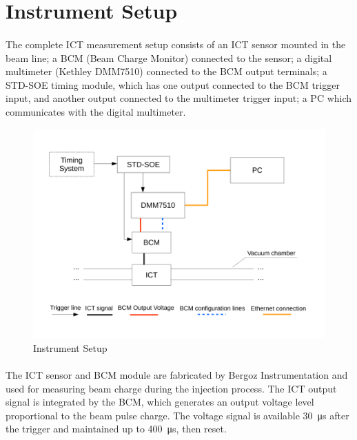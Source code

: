 \documentclass[openany]{article}
\begin{document}
\section{Instrument Setup}

	\paragraph{} The complete ICT measurement setup consists of an ICT sensor mounted in the beam line; a BCM (Beam Charge Monitor) connected to the sensor; a digital multimeter (Kethley DMM7510) connected to the BCM output terminals; a STD-SOE timing module, which has one output connected to the BCM trigger input, and another output connected to the multimeter trigger input; a PC which communicates with the digital multimeter.

	\begin{figure}[!h]
	\caption{Instrument Setup}
	\label{fig:ict-setup}
	\centering
	\includegraphics[width=1.0\textwidth]{ict-setup-image}
	\end{figure}
\FloatBarrier

	\paragraph{} The ICT sensor and BCM module are fabricated by Bergoz Instrumentation and used for measuring beam charge during the injection process. The ICT output signal is integrated by the BCM, which generates an output voltage level proportional to the beam pulse charge. The voltage signal is available \SI{30}{\micro\second} after the trigger and maintained up to \SI{400}{\micro\second}, then reset.
\end{document}

